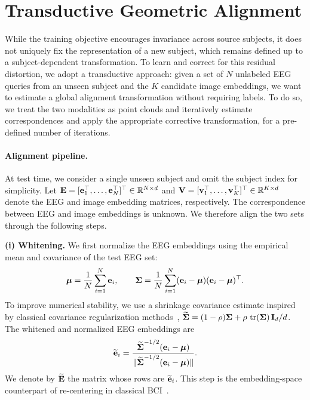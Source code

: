 \documentclass[10pt,twocolumn,letterpaper]{article}
\begin{document}
\section{Transductive Geometric Alignment}
\label{sec:method}

While the training objective encourages invariance across source subjects, it does not uniquely fix the representation of a new subject, which remains defined up to a subject-dependent transformation. To learn and correct for this residual distortion, we adopt a transductive approach: given a set of $N$ unlabeled EEG queries from an unseen subject and the $K$ candidate image embeddings, we want to estimate a global alignment transformation without requiring labels. To do so, we treat the two modalities as point clouds and iteratively estimate correspondences and apply the appropriate corrective transformation, for a pre-defined number of iterations.

\paragraph{Alignment pipeline.}
At test time, we consider a single unseen subject and omit the subject index for simplicity. Let ${\bf E} = [{\bf e}_1^\top,\ldots,{\bf e}_N^\top]^\top \in {\mathbb R}^{N\times d}$ and ${\bf V} = [{\bf v}_1^\top,\ldots,{\bf v}_K^\top]^\top \in {\mathbb R}^{K\times d}$ denote the EEG and image embedding matrices, respectively. The correspondence between EEG and image embeddings is unknown. We therefore align the two sets through the following steps.

\textbf{(i) Whitening.}
We first normalize the EEG embeddings using the empirical mean and covariance of the test EEG set:
\begin{equation}
\hbox{\boldmath$\mu$} = \frac{1}{N}\sum_{i=1}^{N} {\bf e}_i,
\qquad
\hbox{\boldmath$\Sigma$} = \frac{1}{N}\sum_{i=1}^{N}({\bf e}_i-\hbox{\boldmath$\mu$})({\bf e}_i-\hbox{\boldmath$\mu$})^\top .
\end{equation}
To improve numerical stability, we use a shrinkage covariance estimate inspired by classical covariance regularization methods~\cite{ledoit2004honey}, $\widetilde{\hbox{\boldmath$\Sigma$}} = (1-\rho)\hbox{\boldmath$\Sigma$} + \rho\, \operatorname{tr}(\hbox{\boldmath$\Sigma$})\, {\bf I}_d / d$. The whitened and normalized EEG embeddings are
\begin{equation}
\widetilde{{\bf e}}_i = \frac{\widetilde{\hbox{\boldmath$\Sigma$}}^{-1/2}({\bf e}_i-\hbox{\boldmath$\mu$})}{\|\widetilde{\hbox{\boldmath$\Sigma$}}^{-1/2}({\bf e}_i-\hbox{\boldmath$\mu$})\|}.
\end{equation}
We denote by $\widetilde{{\bf E}}$ the matrix whose rows are $\widetilde{{\bf e}}_i$. This step is the embedding-space counterpart of re-centering in classical BCI~\cite{zanini2018transfer,he2020euclidean}.
\end{document}
